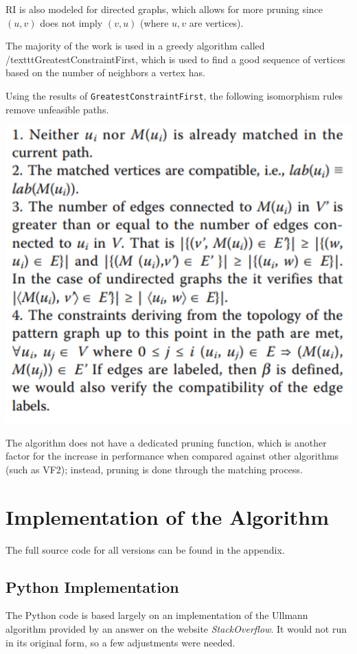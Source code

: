\documentclass{article}
\begin{document}
  RI is also modeled for directed graphs, which allows for more pruning since $(u,v)$ does not imply $(v, u)$ (where $u, v$ are vertices).

  The majority of the work is used in a greedy algorithm called /texttt{GreatestConstraintFirst}, which is used to find a good sequence of vertices based on the number of neighbors a vertex has.

  Using the results of \texttt{GreatestConstraintFirst}, the following isomorphism rules remove unfeasible paths.

  \includegraphics{../images/ri_rules.png}

  The algorithm does not have a dedicated pruning function, which is another factor for the increase in performance when compared against other algorithms (such as VF2); instead, pruning is done through the matching process.


  \cite{bonnici}





\section{Implementation of the Algorithm}

The full source code for all versions can be found in the appendix.

  \subsection{Python Implementation}
  The Python code is based largely on an implementation of the Ullmann algorithm provided by an answer on the website \textit{StackOverflow}.\cite{pyiso} It would not run in its original form, so a few adjustments were needed.
\end{document}
